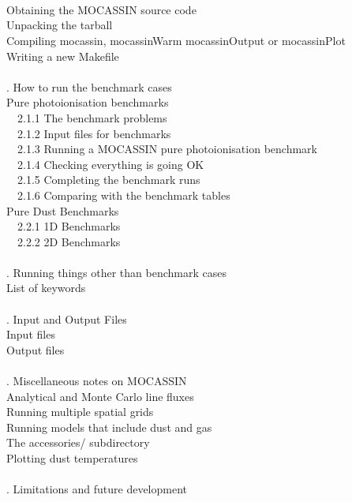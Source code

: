 \documentclass[11pt]{article}
\begin{document}
\\
\\
\\
 Obtaining the MOCASSIN source code\\
 Unpacking the tarball\\
 Compiling mocassin, mocassinWarm mocassinOutput or mocassinPlot\\
 Writing a new Makefile\\
\\
. How to run the benchmark cases\\
 Pure photoionisation benchmarks\\
\indent        ~~2.1.1 The benchmark problems\\
\indent        ~~2.1.2 Input files for benchmarks\\	
\indent        ~~2.1.3 Running a MOCASSIN pure photoionisation benchmark\\
\indent        ~~2.1.4 Checking everything is going OK\\
\indent        ~~2.1.5 Completing the benchmark runs\\
\indent        ~~2.1.6 Comparing with the benchmark tables\\
 Pure Dust Benchmarks\\
\indent        ~~2.2.1 1D Benchmarks\\
\indent        ~~2.2.2 2D Benchmarks\\
\\
. Running things other than benchmark cases\\
 List of keywords\\
\\
. Input and Output Files\\
 Input files\\
 Output files\\
\\
. Miscellaneous notes on MOCASSIN\\
 Analytical and Monte Carlo line fluxes\\
 Running multiple spatial grids\\
 Running models that include dust and gas\\
 The accessories/ subdirectory\\
 Plotting dust temperatures\\
\\
. Limitations and future development\\
\end{document}

